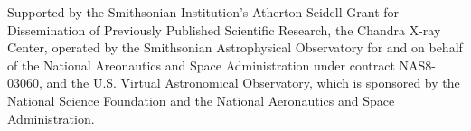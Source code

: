 \acknowledgements Supported by the Smithsonian Institution's Atherton Seidell Grant for Dissemination of Previously Published Scientific Research, the Chandra X-ray Center, operated by the Smithsonian Astrophysical Observatory for and on behalf of the National Areonautics and Space Administration under contract NAS8-03060, and the U.S. Virtual Astronomical Observatory, which is sponsored by the National Science Foundation and the National Aeronautics and Space Administration.



